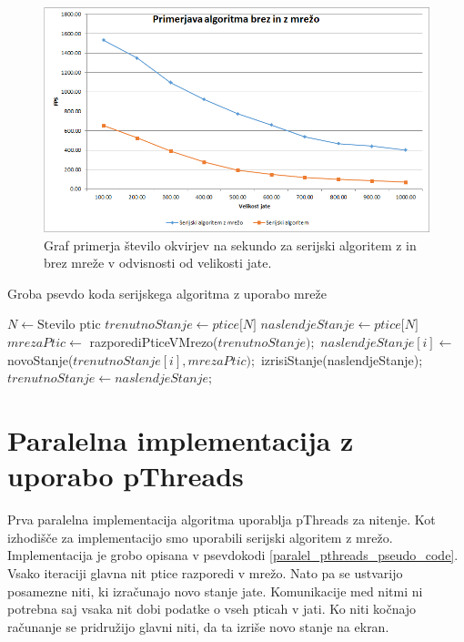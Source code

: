 \documentclass[a4paper, 12pt]{book}
\begin{document}
\begin{figure}[t]
\includegraphics[width=\textwidth]{graf_serial_alg}
\caption{Graf primerja število okvirjev na sekundo za serijski algoritem z in brez mreže v odvisnosti od velikosti jate.}
\label{img:graf_serial_alg}
\centering
\end{figure}

\begin{algorithm}
\caption{Groba psevdo koda serijskega algoritma z uporabo mreže}\label{serial_grid_pseudo_code}
\begin{algorithmic}[1]
\State $N \gets \text{Stevilo ptic}$
\State $trenutnoStanje \gets \textit{ptice[N]}$
\State $naslendjeStanje \gets \textit{ptice[N]}$
\Loop
\State $mrezaPtic \gets$ razporediPticeVMrezo($trenutnoStanje);$
\State $naslendjeStanje[i] \gets$ novoStanje($trenutnoStanje[i], mrezaPtic);$
\EndFor
\State izrisiStanje(naslendjeStanje);
\State $trenutnoStanje \gets naslendjeStanje;$
\EndLoop
\end{algorithmic}
\end{algorithm}

\chapter{Paralelna implementacija z uporabo pThreads}
\label{ch2}
Prva paralelna implementacija algoritma uporablja pThreads za nitenje. Kot izhodišče za implementacijo smo uporabili serijski algoritem z mrežo. Implementacija je grobo opisana v psevdokodi \ref{paralel_pthreads_pseudo_code}. Vsako iteraciji glavna nit ptice razporedi v mrežo. Nato pa se ustvarijo posamezne niti, ki izračunajo novo stanje jate. Komunikacije med nitmi ni potrebna saj vsaka nit dobi podatke o vseh pticah v jati. Ko niti kočnajo računanje se pridružijo glavni niti, da ta izriše novo stanje na ekran.
\end{document}
